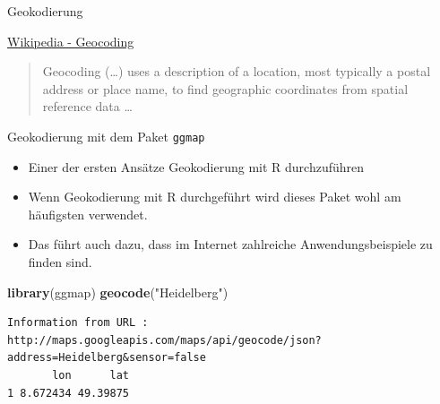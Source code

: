 \documentclass[ignorenonframetext,]{beamer}
\newenvironment{Shaded}{\begin{snugshade}}{\end{snugshade}}
\newcommand{\KeywordTok}[1]{\textcolor[rgb]{0.13,0.29,0.53}{\textbf{#1}}}
\newcommand{\StringTok}[1]{\textcolor[rgb]{0.31,0.60,0.02}{#1}}
\newcommand{\NormalTok}[1]{#1}
\providecommand{\tightlist}{%
  \setlength{\itemsep}{0pt}\setlength{\parskip}{0pt}}
\begin{document}
\begin{frame}{Geokodierung}

\begin{block}{\href{https://github.com/adam-p/markdown-here/wiki/Markdown-Cheatsheet\#blockquotes}{Wikipedia
- Geocoding}}

\begin{quote}
Geocoding (\ldots{}) uses a description of a location, most typically a
postal address or place name, to find geographic coordinates from
spatial reference data \ldots{}
\end{quote}

\end{block}

\end{frame}

\begin{frame}[fragile]{Geokodierung mit dem Paket \texttt{ggmap}}

\begin{itemize}
\tightlist
\item
  Einer der ersten Ansätze Geokodierung mit R durchzuführen
\item
  Wenn Geokodierung mit R durchgeführt wird dieses Paket wohl am
  häufigsten verwendet.
\item
  Das führt auch dazu, dass im Internet zahlreiche Anwendungsbeispiele
  zu finden sind.
\end{itemize}

\begin{Shaded}
\begin{Highlighting}[]
\KeywordTok{library}\NormalTok{(ggmap)}
\KeywordTok{geocode}\NormalTok{(}\StringTok{"Heidelberg"}\NormalTok{)}
\end{Highlighting}
\end{Shaded}

\begin{verbatim}
Information from URL : http://maps.googleapis.com/maps/api/geocode/json?address=Heidelberg&sensor=false
       lon      lat
1 8.672434 49.39875
\end{verbatim}

\end{frame}
\end{document}
